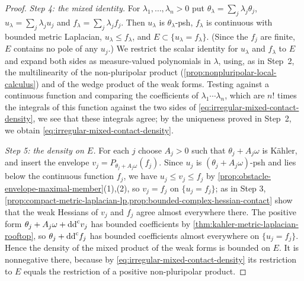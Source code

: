 \begin{proof}
\emph{Step 4: the mixed identity.} For $\lambda_1,\ldots,\lambda_n>0$ put $\theta_\lambda=\sum_j\lambda_j\theta_j$, $u_\lambda=\sum_j\lambda_ju_j$ and $f_\lambda=\sum_j\lambda_jf_j$. Then $u_\lambda$ is $\theta_\lambda$-psh, $f_\lambda$ is continuous with bounded metric Laplacian, $u_\lambda\leq f_\lambda$, and $E\subset\{u_\lambda=f_\lambda\}$. (Since the $f_j$ are finite, $E$ contains no pole of any $u_j$.) We restrict the scalar identity for $u_\lambda$ and $f_\lambda$ to $E$ and expand both sides as measure-valued polynomials in $\lambda$, using, as in Step~2, the multilinearity of the non-pluripolar product (\cref{prop:nonpluripolar-local-calculus}) and of the wedge product of the weak forms. Testing against a continuous function and comparing the coefficients of $\lambda_1\cdots\lambda_n$, which are $n!$ times the integrals of this function against the two sides of \eqref{eq:irregular-mixed-contact-density}, we see that these integrals agree; by the uniqueness proved in Step~2, we obtain \eqref{eq:irregular-mixed-contact-density}.

\emph{Step 5: the density on $E$.} For each $j$ choose $A_j>0$ such that $\theta_j+A_j\omega$ is K\"ahler, and insert the envelope $v_j=P_{\theta_j+A_j\omega}(f_j)$. Since $u_j$ is $(\theta_j+A_j\omega)$-psh and lies below the continuous function $f_j$, we have $u_j\leq v_j\leq f_j$ by \cref{prop:obstacle-envelope-maximal-member}(1),(2), so $v_j=f_j$ on $\{u_j=f_j\}$; as in Step 3, \cref{prop:compact-metric-laplacian-lp,prop:bounded-complex-hessian-contact} show that the weak Hessians of $v_j$ and $f_j$ agree almost everywhere there. The positive form $\theta_j+A_j\omega+\mathrm{dd}^{\mathrm{c}} v_j$ has bounded coefficients by \cref{thm:kahler-metric-laplacian-rooftop}, so $\theta_j+\mathrm{dd}^{\mathrm{c}} f_j$ has bounded coefficients almost everywhere on $\{u_j=f_j\}$. Hence the density of the mixed product of the weak forms is bounded on $E$. It is nonnegative there, because by \eqref{eq:irregular-mixed-contact-density} its restriction to $E$ equals the restriction of a positive non-pluripolar product.
\end{proof}

